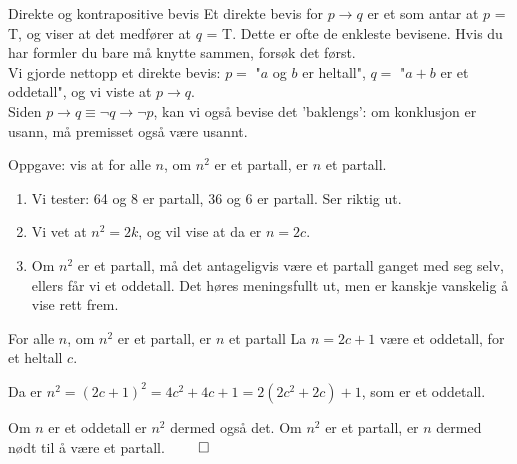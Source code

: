\begin{frame}{Direkte og kontrapositive bevis}
    Et direkte bevis for $p \rightarrow q$ er et som antar at $p$ = T, og viser at det medfører at $q$ = T.
    Dette er ofte de enkleste bevisene. Hvis du har formler du bare må knytte sammen, forsøk det først.\\

    \pause
    Vi gjorde nettopp et direkte bevis: $p =$ "$a$ og $b$ er heltall", $q =$ "$a+b$ er et oddetall", og vi viste at $p \rightarrow q$.\\

    \pause
    Siden $p \rightarrow q \equiv \lnot q \rightarrow \lnot p$, kan vi også bevise det 'baklengs': om konklusjon er usann, må premisset også være usannt.
\end{frame}

\begin{frame}{Oppgave: vis at for alle $n$, om $n^2$ er et partall, er $n$ et partall.}
    \begin{enumerate}
        \pause
        \item Vi tester: 64 og 8 er partall, 36 og 6 er partall. Ser riktig ut.
        \pause
        \item Vi vet at $n^2 = 2k$, og vil vise at da er $n = 2c$.
        \pause
        \item Om $n^2$ er et partall, må det antageligvis være et partall ganget med seg selv, ellers får vi et oddetall. Det høres meningsfullt ut, men er kanskje vanskelig å vise rett frem.
    \end{enumerate}

    \pause
    \begin{block}{For alle $n$, om $n^2$ er et partall, er $n$ et partall}
        La $n = 2c + 1$ være et oddetall, for et heltall $c$.

        \pause
        Da er $n^2 = (2c + 1)^2 = 4c^2 + 4c + 1 = 2(2c^2 + 2c) + 1$, som er et oddetall.

        \pause
        Om $n$ er et oddetall er $n^2$ dermed også det. Om $n^2$ er et partall, er $n$ dermed nødt til å være et partall. $\qed$
    \end{block}
\end{frame}

